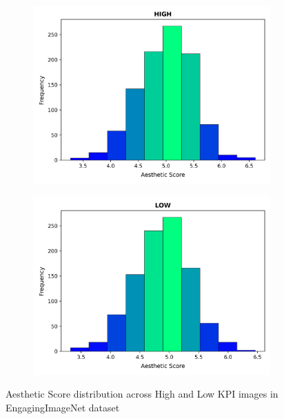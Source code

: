 \begin{figure}[!ht]
    \centering
    \begin{subfigure}[b]{0.75\textwidth}
         \centering
         \includegraphics[width=1\textwidth,scale=0.9]{images/twitter_plots/twitter_aesthetic_score_high.png}
         \caption{}
     \end{subfigure}
     \begin{subfigure}[b]{0.75\textwidth}
         \centering
         \includegraphics[width=1\textwidth,scale=0.9]{images/twitter_plots/twitter_aesthetic_score_low.png}
         \caption{}
     \end{subfigure}

    \caption{Aesthetic Score distribution across High and Low KPI images in EngagingImageNet dataset}
    \label{fig:aesthetic_score_distribution_EngagingImageNet}
\end{figure}




